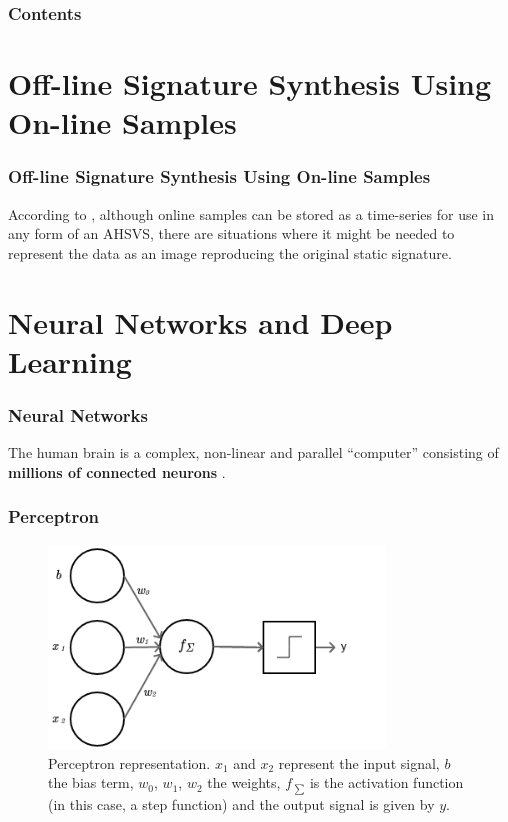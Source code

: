 \documentclass{beamer}
\begin{document}
\begin{frame}
\frametitle{Contents} %
\tableofcontents %
\end{frame}

\section{Off-line Signature Synthesis Using On-line Samples}
\begin{frame}
\frametitle{Off-line Signature Synthesis Using On-line Samples}
According to \parencite{guest2013assessment}, although online samples can be stored as a time-series for use in any form of an AHSVS, there are situations where it might be needed to represent the data as an image reproducing the original static signature. 
\end{frame}

\section{Neural Networks and Deep Learning}

\begin{frame}
\frametitle{Neural Networks}
The human brain is a complex, non-linear and parallel ``computer'' consisting of \textbf{millions of connected neurons} \parencite{haykin2009neural}.
\end{frame}

\begin{frame}
\frametitle{Perceptron}
\begin{figure}[!htb]
\centering
\includegraphics[width=0.8\textwidth]{perceptron}
\caption{Perceptron representation. $x_{1}$ and $x_{2}$ represent the input signal, $b$ the bias term, $w_{0}$, $w_{1}$, $w_{2}$ the weights, $f_{\:\sum}$ is the activation function (in this case, a step function) and the output signal is given by $y$.}
\label{perceptron}
\end{figure}
\end{frame}
\end{document}
